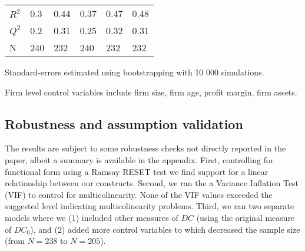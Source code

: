 \documentclass[review,fleqn]{elsarticle}\usepackage[]{graphicx}\usepackage[]{color}
\begin{document}
\begin{table}[t]
\begin{tabular}{l*{5}{l}}
  $R^2$                    & 0.3   & 0.44      & 0.37      & 0.47   & 0.48                             \\
  $Q^2$                    & 0.2   & 0.31      & 0.25      & 0.32   & 0.31                             \\
  N                        & 240   & 232      & 240      & 232   & 232                              \\
  \hline
\end{tabular}
\begin{tablenotes}

      \tiny
      \item Standard-errors estimated using bootstrapping with 10 000 simulations. \vspace{-1em}
      \item Firm level control variables include firm size, firm age,
        profit margin, firm assets.
    \end{tablenotes}
  \end{table}


\subsection*{Robustness and assumption validation}
The results are subject to some robustness checks not directly reported in the paper,
albeit a summary is available in the appendix. First, controlling for functional form
using a Ramsay RESET test we find support for a linear relationship between our
constructs. Second, we ran the a Variance Inflation Test (VIF) to control for
multicolinearity. None of the VIF values exceeded the suggested level indicating
multicolinearity problems. Third, we ran two separate models where we (1) included other
measures of $DC$ (using the original measure of $DC_0$), and (2) added more control
variables to which decreased the sample size (from $N=238$ to $N=205$).
\end{document}
